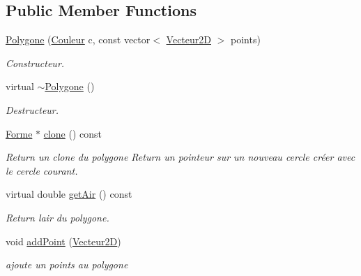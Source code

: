 \subsection*{Public Member Functions}
\begin{DoxyCompactItemize}
\item 
\mbox{\hyperlink{class_polygone_a42d0618a808a036f953c81987cd38d97}{Polygone}} (\mbox{\hyperlink{class_couleur}{Couleur}} c, const vector$<$ \mbox{\hyperlink{class_vecteur2_d}{Vecteur2D}} $>$ points)
\begin{DoxyCompactList}\small\item\em Constructeur. \end{DoxyCompactList}\item 
\mbox{\label{class_polygone_a30baef6bb6fc31ca9a42712b72eb36fc}} 
virtual \mbox{\hyperlink{class_polygone_a30baef6bb6fc31ca9a42712b72eb36fc}{$\sim$\+Polygone}} ()
\begin{DoxyCompactList}\small\item\em Destructeur. \end{DoxyCompactList}\item 
\mbox{\label{class_polygone_aab31a3b2e17d26d665ee9c1e7d1896c2}} 
\mbox{\hyperlink{class_forme}{Forme}} $\ast$ \mbox{\hyperlink{class_polygone_aab31a3b2e17d26d665ee9c1e7d1896c2}{clone}} () const
\begin{DoxyCompactList}\small\item\em Return un clone du polygone Return un pointeur sur un nouveau cercle créer avec le cercle courant. \end{DoxyCompactList}\item 
\mbox{\label{class_polygone_a72fcca629733c87d8c297a0145ec0a57}} 
virtual double \mbox{\hyperlink{class_polygone_a72fcca629733c87d8c297a0145ec0a57}{get\+Air}} () const
\begin{DoxyCompactList}\small\item\em Return l\textquotesingle{}air du polygone. \end{DoxyCompactList}\item 
void \mbox{\hyperlink{class_polygone_ad134e21390e95d8f3d6018df0091b282}{add\+Point}} (\mbox{\hyperlink{class_vecteur2_d}{Vecteur2D}})
\begin{DoxyCompactList}\small\item\em ajoute un points au polygone \end{DoxyCompactList}\item 

\end{DoxyCompactItemize}
